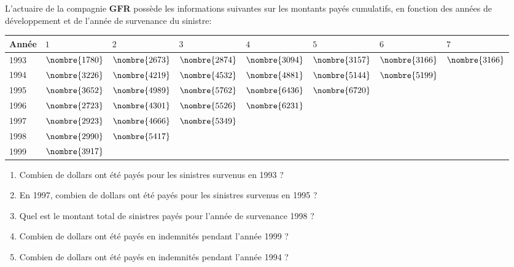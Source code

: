 \begin{exercice}
  L'actuaire de la compagnie \textbf{GFR} possède les informations
  suivantes sur les montants payés cumulatifs, en fonction des années
  de développement et de l'année de survenance du sinistre:
  \begin{center}
    \begin{tabular}{|l|l l l l l l l|}\hline
      Année & $1$ & $2$ & $3$ & $4$ & $5$ & $6$ & $7$\\ \hline
      1993 & $\nombre{1780}$ & $\nombre{2673}$ & $\nombre{2874}$ & $\nombre{3094}$ & $\nombre{3157}$ & $\nombre{3166}$ & $\nombre{3166}$ \\
      1994 & $\nombre{3226}$ & $\nombre{4219}$ & $\nombre{4532}$ & $\nombre{4881}$ & $\nombre{5144}$ & $\nombre{5199}$ & \\
      1995 & $\nombre{3652}$ & $\nombre{4989}$ & $\nombre{5762}$ & $\nombre{6436}$ & $\nombre{6720}$ & & \\
      1996 & $\nombre{2723}$ & $\nombre{4301}$ & $\nombre{5526}$ & $\nombre{6231}$ & & & \\
      1997 & $\nombre{2923}$ & $\nombre{4666}$ & $\nombre{5349}$ & & & & \\
      1998 & $\nombre{2990}$ & $\nombre{5417}$ & & & & & \\
      1999 & $\nombre{3917}$ & & & & & &\\ \hline
    \end{tabular}
  \end{center}

  \begin{enumerate}
  \item Combien de dollars ont été payés pour les sinistres survenus
    en 1993 ?
  \item En 1997, combien de dollars ont été payés pour les sinistres
    survenus en 1995 ?
  \item Quel est le montant total de sinistres payés pour l'année de
    survenance 1998 ?
  \item Combien de dollars ont été payés en indemnités pendant l'année
    1999 ?
  \item Combien de dollars ont été payés en indemnités pendant l'année
    1994 ?
  \end{enumerate}


\end{exercice}
